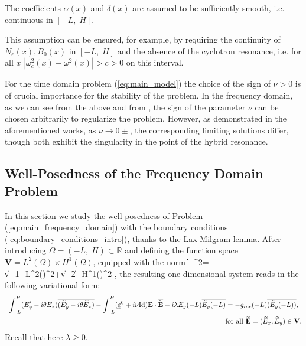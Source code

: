 \begin{assumption}
\label{assumption:smooth}
The coefficients  $\alpha(x)$ and $\delta(x)$ are assumed to be sufficiently smooth, i.e. continuous in  
$\left[-L,\; H\right]$.
\end{assumption}
This assumption can be ensured, for example, by requiring the continuity of $N_e(x), B_0(x)$ in $[-L,\;H]$ and the absence of the cyclotron resonance, i.e. for all $x$ $|\omega_c^2(x)-\omega^2(x)|>c>0$ on this interval. 

\begin{remark}
For the time domain problem (\ref{eq:main_model}) the choice of the sign of $\nu>0$ is of crucial importance for the stability of the problem. 
In the frequency domain, as we can see from the above and from \cite{Despres_2014,LMIG_thesis}, the sign 
of the parameter $\nu$ can be chosen arbitrarily to regularize the problem. 
However, as demonstrated in the aforementioned works, as $\nu\rightarrow 0\pm$, the 
corresponding limiting solutions differ, though both exhibit the singularity in the point of the hybrid resonance.  
\end{remark}

\subsection{Well-Posedness of the Frequency Domain Problem}
\label{sec:wellposedness}

In this section we study the well-posedness of Problem (\ref{eq:main_frequency_domain}) with the 
 boundary conditions (\ref{eq:boundary_conditions_intro}), thanks to the Lax-Milgram lemma. 
After introducing $\Omega=(-L,\; H)\subset \mathbb R$ and defining the function space  $\mathbf{V}=L^{2}(\Omega)\times H^{1}(\Omega)$, 
equipped with the norm
\ben
 \|\|_{}^2= \|v_1\|_{L^{2}(\Omega)}^2+\|v_2\|_{H^{1}(\Omega)}^2 \qquad  {},
\een
the resulting one-dimensional system reads in the following variational form:
\begin{align}
\label{vf1dcase}
\begin{array}{l}
\displaystyle \int_{-L}^H (E_y' -i\theta E_x)\overline{(\widetilde E_y' -i \theta \widetilde E_x)} 
- \int_{-L}^H (\uuline{\varepsilon}^{0} +i\nu \mathrm{Id}) \E \cdot \overline{\widetilde \E}
 - i \lambda E_y (-L)\overline{ \widetilde E_y (-L)} = -g_{inc} (-L) \overline{( \widetilde E_y(-L) )},
\end{array}\\
\nonumber
\text{ for all } \widetilde{\mathbf{E}}=(\widetilde E_x,\widetilde E_y)\in \mathbf{V}.
\end{align}
Recall that here $\lambda\geq 0$. 
 
